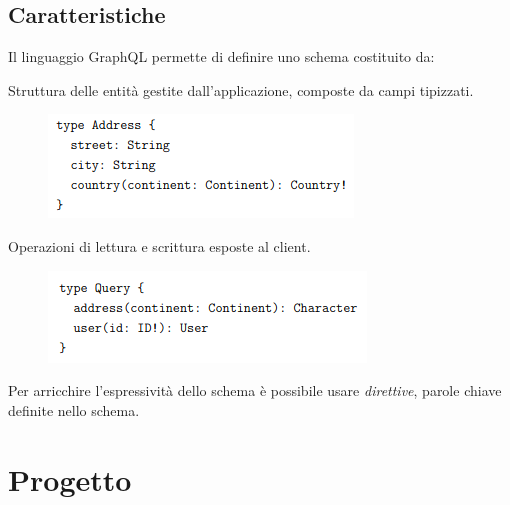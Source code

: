 \documentclass[c]{beamer}
\begin{document}
        \subsection{Caratteristiche}
            \begin{frame}
                Il linguaggio GraphQL permette di definire uno schema costituito da:
                \vfill
                \begin{description}
                    \item[Oggetti] Struttura delle entità gestite dall'applicazione, composte da campi tipizzati.
                    \begin{figure}
                        \includegraphics[height=0.2\textheight]{GraphQL_obj.png}
                    \end{figure}
                    \item[Query e mutazioni] Operazioni di lettura e scrittura esposte al client.
                    \begin{figure}
                        \includegraphics[height=0.2\textheight]{GraphQL_query.png}
                    \end{figure}
                \end{description}
                \vfill
                Per arricchire l'espressività dello schema è possibile usare \emph{direttive}, parole chiave definite nello schema.
            \end{frame}
    
    \section{Progetto}
\end{document}
